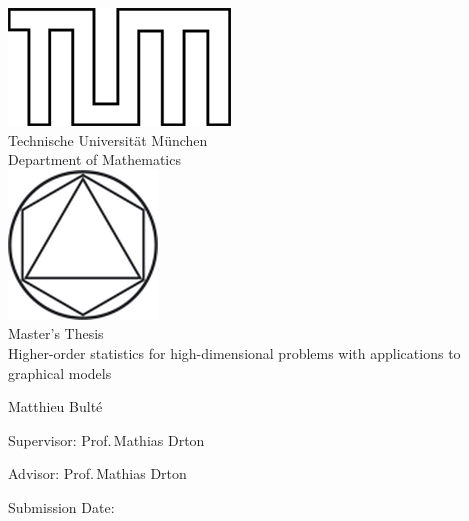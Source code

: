 
\pagestyle{empty}

\begin{titlepage}
    \begin{center}
    \includegraphics{TUMlschwarz.png}\\[3mm]
    \sf
    {\Large
      Technische Universit\"at M\"unchen\\[5mm]
      Department of Mathematics\\[8mm]
    }
    \normalsize
    \includegraphics{TUMlMschwarz.png}\\[15mm]
    
    Master's Thesis\\[15mm]
    
    {\Huge
    Higher-order statistics for high-dimensional problems with applications to graphical models
    }
    \bigskip
    
    \normalsize
    
    Matthieu Bult\'e
    \end{center}
    \vspace*{75mm}
    
    Supervisor: Prof.\,Mathias Drton
    \medskip
    
    Advisor: Prof.\,Mathias Drton
    \medskip
    
    Submission Date: 
    
\end{titlepage}



\newpage


\newpage


% 

\newpage
{}
\pagestyle{headings}